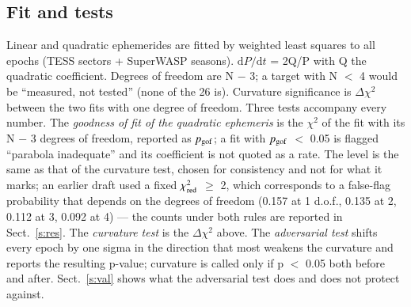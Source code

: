 \documentclass{aa}
\begin{document}
\subsection{Fit and tests}\label{ss:testes}
Linear and quadratic ephemerides are fitted by weighted least squares to all epochs (TESS sectors + SuperWASP seasons). $\mathrm{d}P/\mathrm{d}t$ = 2Q/P with Q the quadratic coefficient. Degrees of freedom are N $-$ 3; a target with N $<$ 4 would be ``measured, not tested'' (none of the 26 is). Curvature significance is $\Delta\chi^2$ between the two fits with one degree of freedom.
Three tests accompany every number. The \emph{goodness of fit of the quadratic ephemeris} is the $\chi^2$ of the fit with its N $-$ 3 degrees of freedom, reported as $p_{\rm gof}$; a fit with $p_{\rm gof}$ $<$ 0.05 is flagged ``parabola inadequate'' and its coefficient is not quoted as a rate. The level is the same as that of the curvature test, chosen for consistency and not for what it marks; an earlier draft used a fixed $\chi^2_{\rm red}$ $\ge$ 2, which corresponds to a false-flag probability that depends on the degrees of freedom (0.157 at 1 d.o.f., 0.135 at 2, 0.112 at 3, 0.092 at 4) --- the counts under both rules are reported in Sect.~\ref{s:res}. The \emph{curvature test} is the $\Delta\chi^2$ above. The \emph{adversarial test} shifts every epoch by one sigma in the direction that most weakens the curvature and reports the resulting p-value; curvature is called only if p $<$ 0.05 both before and after. Sect.~\ref{s:val} shows what the adversarial test does and does not protect against.
\end{document}
